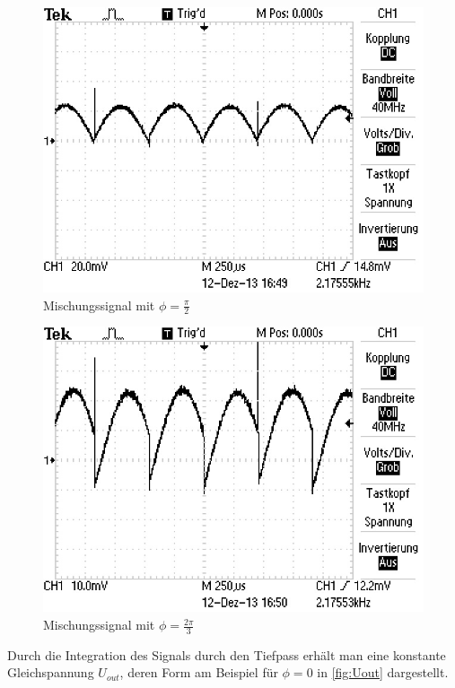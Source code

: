 		\begin{figure}[!h]
			\centering
			\includegraphics[scale=0.4]{Grafiken/Phase_4.jpg}
			\caption{Mischungssignal mit $\phi = \frac{\pi}{2}$}
			\label{fig:Phase4}
		\end{figure}

		\begin{figure}[!h]
			\centering
			\includegraphics[scale=0.4]{Grafiken/Phase_5.jpg}
			\caption{Mischungssignal mit $\phi = \frac{2\pi}{3}$}
			\label{fig:Phase5}
		\end{figure}

	Durch die Integration des Signals durch den Tiefpass erhält man eine konstante Gleichspannung $U_{out}$,
	deren Form am Beispiel für $\phi = 0$ in \cref{fig:Uout} dargestellt.
	 
